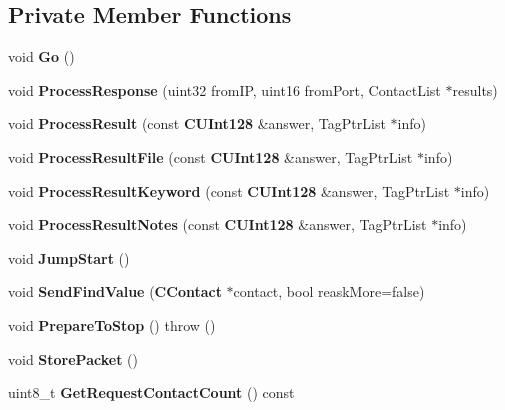 \subsection*{Private Member Functions}
\begin{DoxyCompactItemize}
\item 
void {\bfseries Go} ()\label{classKademlia_1_1CSearch_ac17451fe57bdda65a656f91298262294}

\item 
void {\bfseries ProcessResponse} (uint32 fromIP, uint16 fromPort, ContactList $\ast$results)\label{classKademlia_1_1CSearch_a299f570322fea4ad90d95e2792b79e80}

\item 
void {\bfseries ProcessResult} (const {\bf CUInt128} \&answer, TagPtrList $\ast$info)\label{classKademlia_1_1CSearch_af0a55adf1e4faedb7439197ed1318931}

\item 
void {\bfseries ProcessResultFile} (const {\bf CUInt128} \&answer, TagPtrList $\ast$info)\label{classKademlia_1_1CSearch_a7fa204053fef60da1aaa70d02c960eb3}

\item 
void {\bfseries ProcessResultKeyword} (const {\bf CUInt128} \&answer, TagPtrList $\ast$info)\label{classKademlia_1_1CSearch_a098a52ab6a8b6faa9ba50036a2b107c7}

\item 
void {\bfseries ProcessResultNotes} (const {\bf CUInt128} \&answer, TagPtrList $\ast$info)\label{classKademlia_1_1CSearch_a849a2cea434085c57fdefbbecb4f4ede}

\item 
void {\bfseries JumpStart} ()\label{classKademlia_1_1CSearch_a89290672e3460ae1eb53baeb26a315eb}

\item 
void {\bfseries SendFindValue} ({\bf CContact} $\ast$contact, bool reaskMore=false)\label{classKademlia_1_1CSearch_a77b5ea0fbe1be12e7840d40586cc5a71}

\item 
void {\bfseries PrepareToStop} ()  throw ()\label{classKademlia_1_1CSearch_a3b1365976d64a9969254c55e0408fc39}

\item 
void {\bfseries StorePacket} ()\label{classKademlia_1_1CSearch_aa89d0e28c6ba06dd4be1d7d99ceaa34e}

\item 
uint8\_\-t {\bfseries GetRequestContactCount} () const \label{classKademlia_1_1CSearch_aef7c906757b24aa9a4d9a040fc597cbd}

\end{DoxyCompactItemize}

